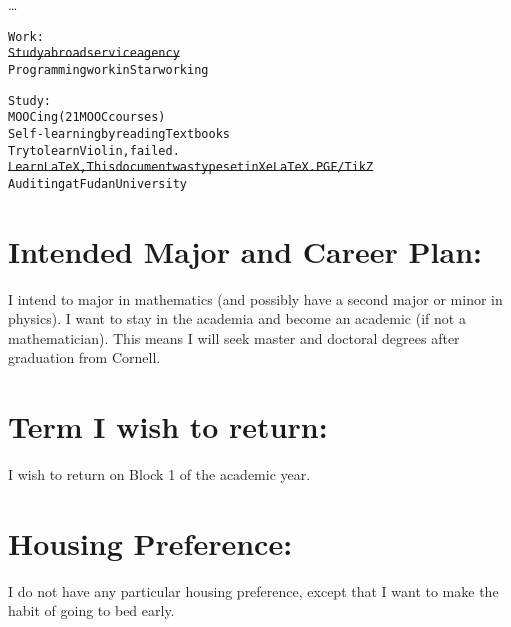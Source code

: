 	\dots
	
	\begin{alltt}
	Work:
	\st{Study abroad service agency}
	Programming work in Starworking
	
	Study:
	MOOCing (21 MOOC courses)
	Self-learning by reading Textbooks
	Try to learn Violin, failed.
	\st{Learn LaTeX, This document was typeset in XeLaTeX. PGF/TikZ}
	Auditing at Fudan University
	\end{alltt}
	
	\section*{Intended Major and Career Plan:}
	I intend to major in mathematics (and possibly have a second major or minor in physics). I want to stay in the academia and become an academic (if not a mathematician). This means I will seek master and doctoral degrees after graduation from Cornell.
	
	\section*{Term I wish to return:}
	I wish to return on Block 1 of the  academic year.
	
	\section*{Housing Preference:}
	I do not have any particular housing preference, except that I want to make the habit of going to bed early.
	
	\pagebreak \nocite{*}
	
	\printbibliography
